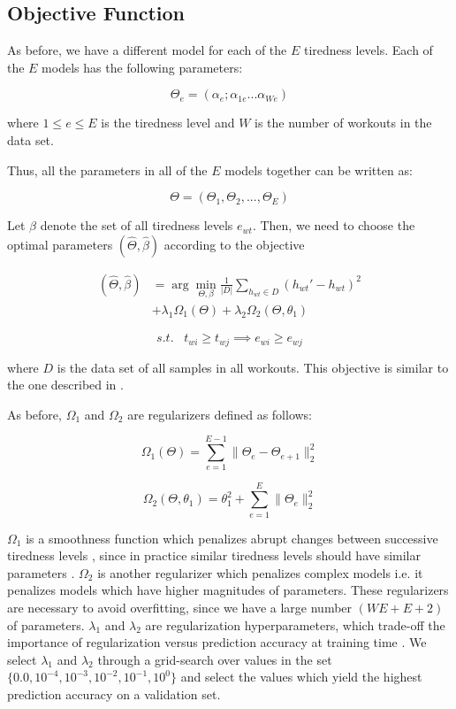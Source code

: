 \documentclass{acm_proc_article-sp}
\begin{document}
\subsection{Objective Function}
As before, we have a different model for each of the $E$ tiredness levels. Each of the $E$ models has the following parameters:

$$\Theta_e = (\alpha_e; \alpha_{1e}...\alpha_{We})$$

where $1 \leq e \leq E$ is the tiredness level and $W$ is the number of workouts in the data set.

Thus, all the parameters in all of the $E$ models together can be written as:

$$\Theta = (\Theta_1, \Theta_2,..., \Theta_E)$$

Let $\beta$ denote the set of all tiredness levels $e_{wt}$. Then, we need to choose the optimal parameters $(\hat{\Theta}, \hat{\beta})$ according to the objective

\begin{align}
\label{eqnObjective2}
(\hat{\Theta}, \hat{\beta})  &= \arg\min_{\Theta,\beta}\frac{1}{|D|} \sum_{h_{wt} \in D}(h_{wt}' - h_{wt})^2 \nonumber \\
 & + \lambda_1\Omega_1(\Theta) + \lambda_2\Omega_2(\Theta, \theta_1)
\end{align}

$$s.t. \; \; \; t_{wi} \geq t_{wj} \implies e_{wi} \geq e_{wj} $$

where $D$ is the data set of all samples in all workouts. This objective is similar to the one described in \cite{www13}.

As before, $\Omega_1$ and $\Omega_2$ are regularizers defined as follows:

$$\Omega_1(\Theta) = \sum_{e=1}^{E-1}{\|\Theta_e - \Theta_{e+1}\|_2^2}$$

$$\Omega_2(\Theta, \theta_1) = \theta_1^2 + \sum_{e=1}^{E}{\|\Theta_e \|_2^2}$$

$\Omega_1$ is a smoothness function which penalizes abrupt changes between successive tiredness levels \cite{www13}, since in practice similar tiredness levels should have similar parameters \cite{www13}. $\Omega_2$ is another regularizer which penalizes complex models i.e. it penalizes models which have higher magnitudes of parameters. These regularizers are necessary to avoid overfitting, since we have a large number $(WE + E + 2)$ of parameters. $\lambda_1$ and $\lambda_2$ are regularization hyperparameters, which trade-off the importance of regularization versus prediction accuracy at training time \cite{www13}. We select $\lambda_1$ and $\lambda_2$ through a grid-search over values in the set $\{0.0, 10^{-4}, 10^{-3}, 10^{-2}, 10^{-1}, 10^{0}\}$ and select the values which yield the highest prediction accuracy on a validation set.
\end{document}
